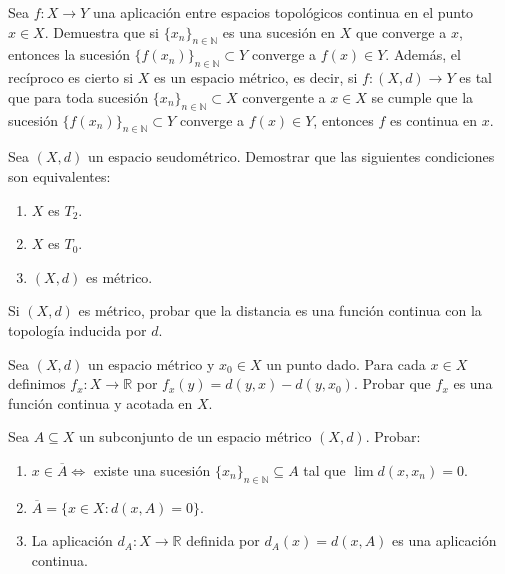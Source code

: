 \begin{ejer}[122]
Sea $f \colon X \to Y$ una aplicación entre espacios topológicos continua en el punto $x \in X$. Demuestra que si $\{x_n\}_{n \in \mathbb{N}}$ es una sucesión en $X$ que converge a $x$, entonces la sucesión $\{f(x_n)\}_{n \in \mathbb{N}} \subset Y$ converge a $f(x) \in Y$. Además, el recíproco es cierto si $X$ es un espacio métrico, es decir, si $f \colon (X, d) \to Y$ es tal que para toda sucesión $\{x_n\}_{n \in \mathbb{N}} \subset X$ convergente a $x \in X$ se cumple que la sucesión $\{f(x_n)\}_{n \in \mathbb{N}} \subset Y$ converge a $f(x) \in Y$, entonces $f$ es continua en $x$.
\end{ejer}

\begin{ejer}[123]
Sea $(X, d)$ un espacio seudométrico. Demostrar que las siguientes condiciones son equivalentes:
\begin{enumerate}
    \item[a)] $X$ es $T_2$.
    \item[b)] $X$ es $T_0$.
    \item[c)] $(X, d)$ es métrico.
\end{enumerate}
\end{ejer}

\begin{ejer}[124]
Si $(X, d)$ es métrico, probar que la distancia es una función continua con la topología inducida por $d$.
\end{ejer}

\begin{ejer}[125]
Sea $(X, d)$ un espacio métrico y $x_0 \in X$ un punto dado. Para cada $x \in X$ definimos $f_x \colon X \to \mathbb{R}$ por $f_x(y) = d(y,x) - d(y, x_0)$. Probar que $f_x$ es una función continua y acotada en $X$.
\end{ejer}

\begin{ejer}[126]
Sea $A \subseteq X$ un subconjunto de un espacio métrico $(X, d)$. Probar:
\begin{enumerate}
    \item[a)] $x \in \overline{A} \iff$ existe una sucesión $\{x_n\}_{n \in \mathbb{N}} \subseteq A$ tal que $\lim d(x, x_n) = 0$.
    \item[b)] $\overline{A} = \{x \in X : d(x, A) = 0\}$.
    \item[c)] La aplicación $d_A \colon X \to \mathbb{R}$ definida por $d_A(x) = d(x, A)$ es una aplicación continua.
\end{enumerate}
\end{ejer}

